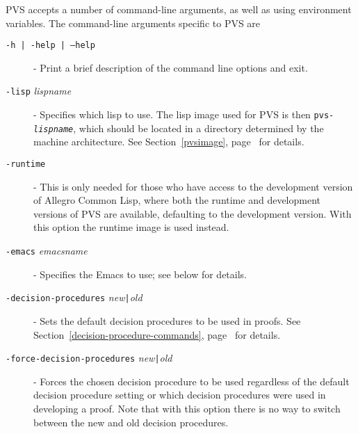 PVS accepts a number of command-line arguments, as well as using
environment variables.  The command-line arguments specific to PVS are
\begin{description}

\item[\texttt{-h | -help | --help}]
  - Print a brief description of the command
  line options and exit.

\item[\texttt{-lisp} \emph{lispname}]
   -
  Specifies which lisp to use. The lisp image used for PVS is then
  \texttt{pvs-\emph{lispname}}, which should be located in a directory
  determined by the machine architecture.  See Section~\ref{pvsimage},
  page~\pageref{pvsimage} for details.

\item[\texttt{-runtime}]
  - This is only
  needed for those who have access to the development version of Allegro
  Common Lisp, where both the runtime and development versions of PVS are
  available, defaulting to the development version.  With this option the
  runtime image is used instead.

\item[\texttt{-emacs} \emph{emacsname}]
  -
  Specifies the Emacs to use; see below for details.

\item[\texttt{-decision-procedures} \emph{new}\texttt{|}\emph{old}]
  - Sets the default decision procedures to be used in proofs.  See
  Section~\ref{decision-procedure-commands},
  page~\pageref{decision-procedure-commands} for details.

\item[\texttt{-force-decision-procedures} \emph{new}\texttt{|}\emph{old}]
  - Forces the chosen decision procedure to be used regardless of the
  default decision procedure setting or which decision procedures were
  used in developing a proof.  Note that with this option there is no way
  to switch between the new and old decision procedures.


\end{description}
